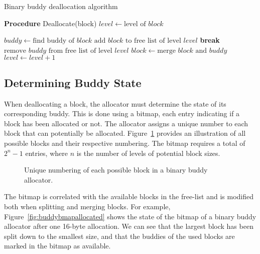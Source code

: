 \begin{algorithm}[h]
  \caption{Binary buddy deallocation algorithm}
  \label{alg:bbuddy_dealloc}
  \begin{algorithmic}[1]
    \Statex \textbf{Procedure} Deallocate(block)
    \State $level \gets \text{level of } block$

    \State $buddy \gets \text{find buddy of } block$
    \State $\text{add } block \text{ to free list of level } level$
    \State \textbf{break}
    \Else
    \State $\text{remove } buddy \text{ from free list of level } level$
    \State $block \gets \text{merge } block \text{ and } buddy$
    \State $level \gets level + 1$
    \EndIf
    \EndWhile
  \end{algorithmic}
\end{algorithm}

\subsection{Determining Buddy State}
When deallocating a block, the allocator must determine the state of its corresponding buddy. This is done using a bitmap, each entry indicating if a block has been allocated or not. The allocator assigns a unique number to each block that can potentially be allocated. Figure~\ref{fig:buddyorder} provides an illustration of all possible blocks and their respective numbering. The bitmap requires a total of $2^n - 1$ entries, where $n$ is the number of levels of potential block sizes.

\begin{figure}[h]
  \centering
  
  \caption{Unique numbering of each possible block in a binary buddy allocator.}
  \label{fig:buddyorder}
\end{figure}
The bitmap is correlated with the available blocks in the free-list and is modified both when splitting and merging blocks. For example, Figure~\ref{fig:buddybmapallocated} shows the state of the bitmap of a binary buddy allocator after one 16-byte allocation. We can see that the largest block has been split down to the smallest size, and that the buddies of the used blocks are marked in the bitmap as available.


